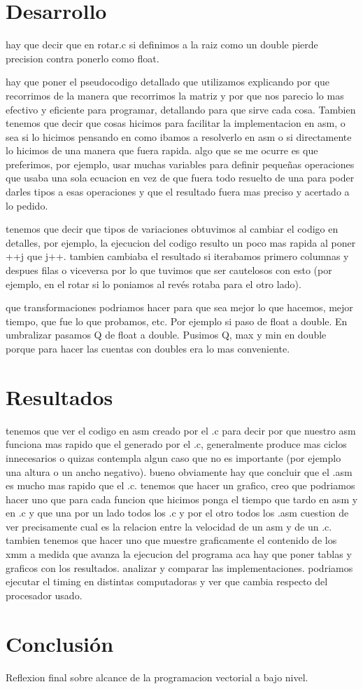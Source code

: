 \documentclass[10pt, a4paper]{article}
\begin{document}
\section{Desarrollo}
hay que decir que en rotar.c si definimos a la raiz como un double pierde precision contra ponerlo como float.\newline

hay que poner el pseudocodigo detallado que utilizamos explicando por que recorrimos de la manera que recorrimos la matriz y por que nos parecio lo mas efectivo y eficiente para programar, detallando para que sirve cada cosa. Tambien tenemos que decir que cosas hicimos para facilitar la implementacion en asm, o sea si lo hicimos pensando en como ibamos a resolverlo en asm o si directamente lo hicimos de una manera que fuera rapida. algo que se me ocurre es que preferimos, por ejemplo, usar muchas variables para definir pequeñas operaciones que usaba una sola ecuacion en vez de que fuera todo resuelto de una para poder darles tipos a esas operaciones y que el resultado fuera mas preciso y acertado a lo pedido.\newline

tenemos que decir que tipos de variaciones obtuvimos al cambiar el codigo en detalles, por ejemplo, la ejecucion del codigo resulto un poco mas rapida al poner ++j que j++. tambien cambiaba el resultado si iterabamos primero columnas y despues filas o viceversa por lo que tuvimos que ser cautelosos con esto (por ejemplo, en el rotar si lo poniamos al revés rotaba para el otro lado).\newline

que transformaciones podriamos hacer para que sea mejor lo que hacemos, mejor tiempo, que fue lo que probamos, etc. Por ejemplo si paso de float a double. En umbralizar pasamos Q de float a double. Pusimos Q, max y min en double porque para hacer las cuentas con doubles era lo mas conveniente.
\newline
\section{Resultados}
tenemos que ver el codigo en asm creado por el .c para decir por que nuestro asm funciona mas rapido que el generado por el .c, generalmente produce mas ciclos innecesarios o quizas contempla algun caso que no es importante (por ejemplo una altura o un ancho negativo). bueno obviamente hay que concluir que el .asm es mucho mas rapido que el .c.\newline
tenemos que hacer un grafico, creo que podriamos hacer uno que para cada funcion que hicimos ponga el tiempo que tardo en asm y en .c y que una por un lado todos los .c y por el otro todos los .asm cuestion de ver precisamente cual es la relacion entre la velocidad de un asm y de un .c. tambien tenemos que hacer uno que muestre graficamente el contenido de los xmm a medida que avanza la ejecucion del programa\newline
aca hay que poner tablas y graficos con los resultados. analizar y comparar las implementaciones. podriamos ejecutar el timing en distintas computadoras y ver que cambia respecto del procesador usado.
\section{Conclusi\'on}
Reflexion final sobre alcance de la programacion vectorial a bajo nivel. 
\end{document}

